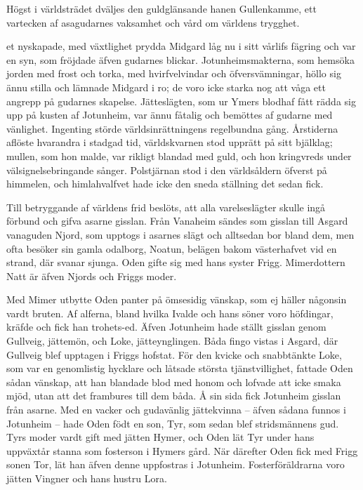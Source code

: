 Högst i världsträdet dväljes den guldglänsande hanen Gullenkamme, ett
vartecken af asagudarnes vaksamhet och vård om världens trygghet.





\dropcapD et nyskapade, med växtlighet prydda Midgard låg nu i sitt vårlifs
fägring och var en syn, som fröjdade äfven gudarnes blickar.
Jotunheimsmakterna, som hemsöka jorden med frost och torka, med
hvirfvelvindar och öfversvämningar, höllo sig ännu stilla och lämnade
Midgard i ro; de voro icke starka nog att våga ett angrepp på gudarnes
skapelse. Jätteslägten, som ur Ymers blodhaf fått rädda sig upp på
kusten af Jotunheim, var ännu fåtalig och bemöttes af gudarne med
vänlighet. Ingenting störde världsinrättningens regelbundna gång.
Årstiderna aflöste hvarandra i stadgad tid, världskvarnen stod upprätt
på sitt bjälklag; mullen, som hon malde, var rikligt blandad med guld,
och hon kringvreds under välsignelsebringande sånger. Polstjärnan stod i
den världsåldern öfverst på himmelen, och himlahvalfvet hade icke den
sneda ställning det sedan fick.

Till betryggande af världens frid beslöts, att alla varelseslägter
skulle ingå förbund och gifva asarne gisslan. Från Vanaheim sändes som
gisslan till Asgard vanaguden Njord, som upptogs i asarnes slägt och
alltsedan bor bland dem, men ofta besöker sin gamla odalborg, Noatun,
belägen bakom västerhafvet vid en strand, där svanar sjunga. Oden gifte
sig med hans syster Frigg. Mimerdottern Natt är äfven Njords och Friggs
moder.

Med Mimer utbytte Oden panter på ömsesidig vänskap, som ej häller
någonsin vardt bruten. Af alferna, bland hvilka Ivalde och hans söner
voro höfdingar, kräfde och fick han trohets-ed. Äfven Jotunheim hade
ställt gisslan genom Gullveig, jättemön, och Loke, jätteynglingen. Båda
fingo vistas i Asgard, där Gullveig blef upptagen i Friggs hofstat. För
den kvicke och snabbtänkte Loke, som var en genomlistig hycklare och
låtsade största tjänstvillighet, fattade Oden sådan vänskap, att han
blandade blod med honom och lofvade att icke smaka mjöd, utan att det
frambures till dem båda. Å sin sida fick Jotunheim gisslan från asarne.
Med en vacker och gudavänlig jättekvinna -- äfven sådana funnos i
Jotunheim -- hade Oden födt en son, Tyr, som sedan blef stridsmännens
gud. Tyrs moder vardt gift med jätten Hymer, och Oden lät Tyr under hans
uppväxtår stanna som fosterson i Hymers gård. När därefter Oden fick med
Frigg sonen Tor, lät han äfven denne uppfostras i Jotunheim.
Fosterföräldrarna voro jätten Vingner och hans hustru Lora.

